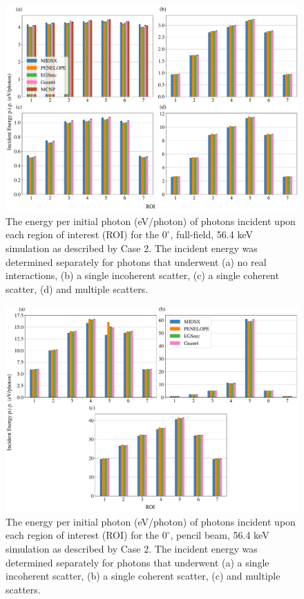 \documentclass[%
 aip,
cp,  %
 amsmath,amssymb,%
reprint,%
]{revtex4-2}
\begin{document}
\begin{figure}[H]
    \centering
	\includegraphics[width=1.0\textwidth]{../figures/ROI_0_deg_paper_ready.pdf}
	\caption{The energy per initial photon (eV/photon) of photons incident upon each region of interest (ROI) for the $0^\circ$, full-field, 56.4 keV simulation as described by Case 2. The incident energy was determined separately for photons that underwent (a) no real interactions, (b) a single incoherent scatter, (c) a single coherent scatter, (d) and multiple scatters.}
	\label{figure:ROIFFGraph}
\end{figure}

\begin{figure}[H]
    \centering
	\includegraphics[width=1.0\textwidth]{../figures/ROI_0_deg_pencil_paper_ready.pdf}
	\caption{The energy per initial photon (eV/photon) of photons incident upon each region of interest (ROI) for the $0^\circ$, pencil beam, 56.4 keV simulation as described by Case 2. The incident energy was determined separately for photons that underwent (a) a single incoherent scatter, (b) a single coherent scatter, (c) and multiple scatters.}
	\label{figure:ROIPGraph}
\end{figure}
\end{document}
